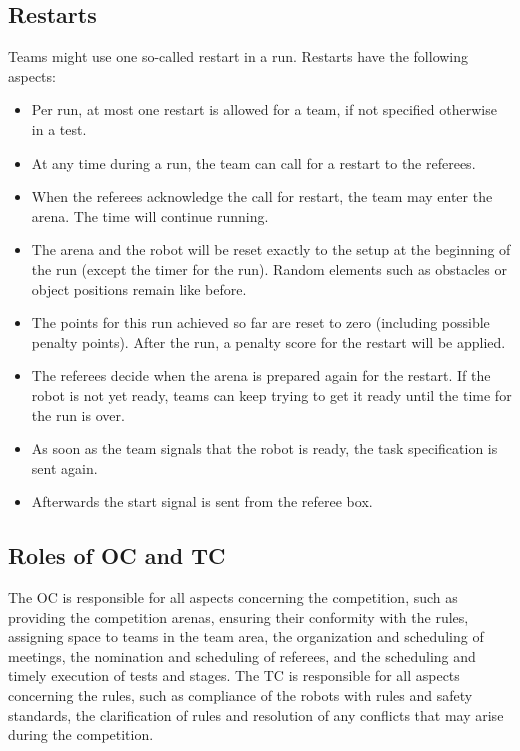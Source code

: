 \subsection{Restarts}
Teams might use one so-called restart in a run. Restarts have the following aspects:

\begin{itemize}

	\item Per run, at most one restart is allowed for a team, if not specified 			otherwise in a test.
	\item At any time during a run, the team can call for a restart to the 				referees.
	\item When the referees acknowledge the call for restart, the team may enter the 			arena. The time will continue running.
	\item The arena and the robot will be reset exactly to the setup at the 				beginning of the run (except the timer for the run). Random elements such as 			obstacles or object positions remain like before.
	\item The points for this run achieved so far are reset to zero (including 			possible penalty points). After the run, a penalty score for the restart will 	be applied.
	\item The referees decide when the arena is prepared again for the restart. If 	the robot is not yet ready, teams can keep trying to get it ready until the 			time for the run is over.
	\item As soon as the team signals that the robot is ready, the task 					specification is sent again.
	\item Afterwards the start signal is sent from the referee box.

\end{itemize}

\subsection{Roles of OC and TC}
The OC is responsible for all aspects concerning the competition, such as providing the competition arenas, ensuring their conformity with the rules, assigning space to teams in the team area, the organization and scheduling of meetings, the nomination and scheduling of referees, and the scheduling and timely execution of tests and stages.
The TC is responsible for all aspects concerning the rules, such as compliance of the robots with rules and safety standards, the clarification of rules and resolution of any conflicts that may arise during the competition.

